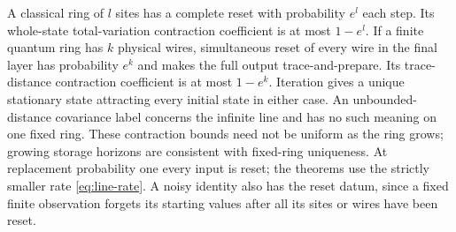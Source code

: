 \begin{remark}\label{rem:line-rings}
A classical ring of $l$ sites has a complete reset with probability
$e^l$ each step. Its whole-state total-variation contraction
coefficient is at most $1-e^l$. If a finite quantum ring has $k$
physical wires, simultaneous reset of every wire in the final layer
has probability $e^k$ and makes the full output trace-and-prepare.
Its trace-distance contraction coefficient is at most $1-e^k$.
Iteration gives a unique stationary state attracting every initial
state in either case. An unbounded-distance covariance label concerns
the infinite line and has no such meaning on one fixed ring. These
contraction bounds need not be uniform as the ring grows; growing
storage horizons are consistent with fixed-ring uniqueness.
At replacement probability one every input is reset; the theorems
use the strictly smaller rate \eqref{eq:line-rate}. A noisy identity
also has the reset datum, since a fixed finite observation forgets
its starting values after all its sites or wires have been reset.
\end{remark}

